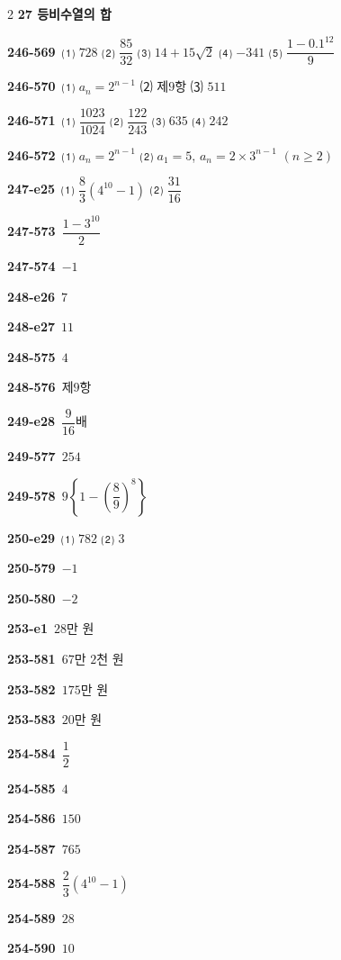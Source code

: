 \documentclass[10pt,a4paper]{article}
\begin{document}
\begin{multicols}{2}
\noindent\textbf{27 등비수열의 합}\par\smallskip
\noindent\textbf{246-569}\ ⑴ $728$ ⑵ $\dfrac{85}{32}$ ⑶ $14+15\sqrt{2}$ ⑷ $-341$ ⑸ $\dfrac{1-0.1^{12}}{9}$\par
\noindent\textbf{246-570}\ ⑴ $a_n=2^{n-1}$ ⑵ 제$9$항 ⑶ $511$\par
\noindent\textbf{246-571}\ ⑴ $\dfrac{1023}{1024}$ ⑵ $\dfrac{122}{243}$ ⑶ $635$ ⑷ $242$\par
\noindent\textbf{246-572}\ ⑴ $a_n=2^{n-1}$ ⑵ $a_1=5$, $a_n=2\times 3^{n-1}$ $(n\ge 2)$\par
\noindent\textbf{247-e25}\ ⑴ $\dfrac{8}{3}(4^{10}-1)$ ⑵ $\dfrac{31}{16}$\par
\noindent\textbf{247-573}\ $\dfrac{1-3^{10}}{2}$\par
\noindent\textbf{247-574}\ $-1$\par
\noindent\textbf{248-e26}\ $7$\par
\noindent\textbf{248-e27}\ $11$\par
\noindent\textbf{248-575}\ $4$\par
\noindent\textbf{248-576}\ 제$9$항\par
\noindent\textbf{249-e28}\ $\dfrac{9}{16}$배\par
\noindent\textbf{249-577}\ $254$\par
\noindent\textbf{249-578}\ $9\left\{1-\left(\dfrac{8}{9}\right)^{8}\right\}$\par
\noindent\textbf{250-e29}\ ⑴ $782$ ⑵ $3$\par
\noindent\textbf{250-579}\ $-1$\par
\noindent\textbf{250-580}\ $-2$\par
\noindent\textbf{253-e1}\ $28$만 원\par
\noindent\textbf{253-581}\ $67$만 $2$천 원\par
\noindent\textbf{253-582}\ $175$만 원\par
\noindent\textbf{253-583}\ $20$만 원\par
\noindent\textbf{254-584}\ $\dfrac{1}{2}$\par
\noindent\textbf{254-585}\ $4$\par
\noindent\textbf{254-586}\ $150$\par
\noindent\textbf{254-587}\ $765$\par
\noindent\textbf{254-588}\ $\dfrac{2}{3}(4^{10}-1)$\par
\noindent\textbf{254-589}\ $28$\par
\noindent\textbf{254-590}\ $10$\par

\end{multicols}
\end{document}
